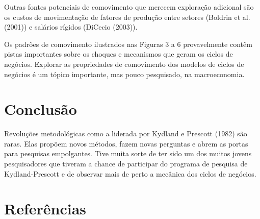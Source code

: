 \documentclass[12pt]{article}
\begin{document}
Outras fontes potenciais de comovimento que merecem exploração adicional são os custos de movimentação de fatores de produção entre setores (Boldrin et al. (2001)) e salários rígidos (DiCecio (2003)).

Os padrões de comovimento ilustrados nas Figuras 3 a 6 provavelmente contêm pistas importantes sobre os choques e mecanismos que geram os ciclos de negócios. Explorar as propriedades de comovimento dos modelos de ciclos de negócios é um tópico importante, mas pouco pesquisado, na macroeconomia.

\section{Conclusão}

Revoluções metodológicas como a liderada por Kydland e Prescott (1982) são raras. Elas propõem novos métodos, fazem novas perguntas e abrem as portas para pesquisas empolgantes. Tive muita sorte de ter sido um dos muitos jovens pesquisadores que tiveram a chance de participar do programa de pesquisa de Kydland-Prescott e de observar mais de perto a mecânica dos ciclos de negócios.

\newpage

\section*{Referências}
\end{document}
